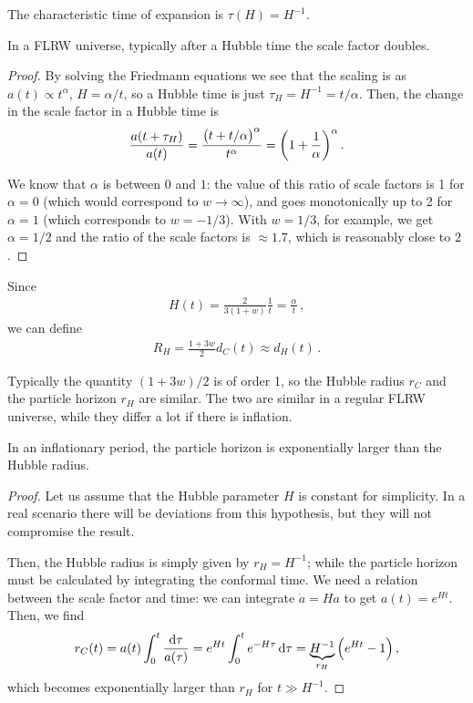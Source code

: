 \documentclass[main.tex]{subfiles}
\begin{document}
The characteristic time of expansion is \(\tau (H ) =H^{-1}\). 

\begin{claim}
In a FLRW universe, typically after a Hubble time the scale factor doubles.
\end{claim}

\begin{proof}
By solving the Friedmann equations we see that the scaling is as \(a(t) \propto t^{\alpha }\), \(H = \alpha /t \), so a Hubble time is just \(\tau _H = H^{-1} = t / \alpha \). Then, the change in the scale factor in a Hubble time is 
%
\begin{align}
\frac{a (t + \tau _H)}{a(t)} = \frac{\qty(t + t/ \alpha )^{\alpha }}{t^{\alpha }} = \qty(1 + \frac{1}{\alpha })^{\alpha }
\,.
\end{align}

We know that \(\alpha \) is between \(0\) and \(1\): the value of this ratio of scale factors is 1 for \(\alpha = 0\) (which would correspond to \(w \to \infty \)), and goes monotonically up to 2 for \(\alpha = 1\) (which corresponds to \(w = -1/3\)).
With \(w = 1/3\), for example, we get \(\alpha = 1/2\) and the ratio of the scale factors is \(\approx \num{1.7}\), which is reasonably close to \(2\).
\end{proof}

Since 
%
\begin{align}
H(t) = \frac{2}{3 (1+w)} \frac{1}{t} = \frac{\alpha}{t}
\,,
\end{align}
%
we can define
%
\begin{align}
R_H = \frac{1 + 3w}{2} d_C (t) \approx d_H (t)
\,.
\end{align}

Typically the quantity \((1+3w) / 2\) is of order 1, so the Hubble radius \(r_C\) and the particle horizon \(r_H\) are similar.
The two are similar in a regular FLRW universe, while they differ a lot if there is inflation. 

\begin{claim}
In an inflationary period, the particle horizon is exponentially larger than the Hubble radius.
\end{claim}

\begin{proof}
Let us assume that the Hubble parameter \(H\) is constant for simplicity. In a real scenario there will be deviations from this hypothesis, but they will not compromise the result. 

Then, the Hubble radius is simply given by \(r_H = H^{-1}\); while the particle horizon must be calculated by integrating the conformal time. 
We need a relation between the scale factor and time: we can integrate \(\dot{a} = H a\) to get \(a(t) = e^{Ht}\). Then, we find 
%
\begin{align}
r_C(t) = a(t) \int_{0}^{t} \frac{ \dd{\tau }}{a(\tau )} = e^{Ht} \int_{0}^{t} e^{-H \tau } \dd{\tau  } = \underbrace{H^{-1}}_{r_H} \qty(e^{Ht} - 1)
\,,
\end{align}
%
which becomes exponentially larger than \(r_H\) for \(t \gg H^{-1}\).
\end{proof}
\end{document}
